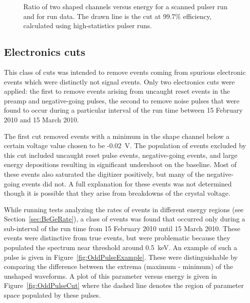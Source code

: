 			\begin{figure}
				\centering
				\caption[Microphonics cuts on data and scanned pulser runs]
				{Ratio of two shaped channels versus energy for a scanned pulser run and for run data.  The drawn line is the cut at 99.7\% efficiency, calculated using
				high-statistics pulser runs.}
				\label{fig:RatioOfShapedChannelsFinal}
			\end{figure}
	
	
		\subsection{Electronics cuts}
		\label{sec:BeGeElecCuts}
	
	This class of cuts was intended to remove events coming from spurious electronic events which were distinctly not signal events.  Only two electronics cuts were applied: the first to remove events arising from uncaught reset events in the preamp and negative-going pulses, the second to remove noise pulses that were found to occur during a particular interval of the run time between 15 February 2010 and 15 March 2010.  
	
	The first cut removed events with a minimum in the shape channel below a certain voltage value chosen to be -0.02~V.  The population of events excluded by this cut included uncaught reset pulse events, negative-going events, and large energy depositions resulting in significant undershoot on the baseline.  Most of these events also saturated the digitizer positively, but many of the negative-going events did not.  A full explanation for these events was not determined though it is possible that they arise from breakdowns of the crystal voltage.  %
	
	While running tests analyzing the rates of events in different energy regions (see Section~\ref{sec:BeGeRate}), a class of events was found that occurred only during a sub-interval of the run time from 15 February 2010 until 15 March 2010.  These events were distinctive from true events, but were problematic because they populated the spectrum near threshold around 0.5~keV.   An example of such a pulse is given in Figure~\ref{fig:OddPulseExample}.  These were distinguishable by comparing the difference between the extrema (maximum - minimum) of the unshaped waveforms.  A plot of this parameter versus energy is given in Figure~\ref{fig:OddPulseCut} where the dashed line denotes the region of parameter space populated by these pulses.  
	
